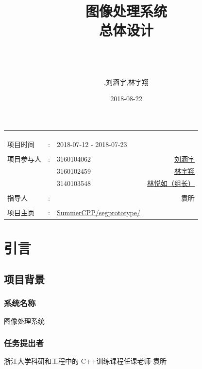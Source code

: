 \documentclass[14pt,a4paper]{article}
\title{ \Huge 图像处理系统 \\\LARGE 总体设计}
\author{\newline \\\\\\ \textsc{\Large林悦如,刘涵宇,林宇翔}  }
\date{\Large 2018-08-22}
\begin{document}
\newpage
\maketitle 

\begin{center}
\begin{tabular}{l r l r}
\\ \\ \\ \\ 
\large 项目时间&: & 2018-07-12 - 2018-07-23 & \\ \\  
\large 项目参与人&: & \large3160104062 & \large \href{mailto:544766109@qq.com}{刘涵宇}\\
\large & &\large 3160102459 & \large\href{mailto:2106706074@qq.com}{林宇翔} \\
\large & &\large3140103548 &\large\href{mailto:lo0g1t7031@gmail.com}{林悦如（组长）} \\ \\
\large 指导人&: &  & \large 袁昕 \\\\
\large 项目主页&: & \large \href{https://www.github.com/SummerCPP/segprototype/}{SummerCPP/segprototype/}
\end{tabular}
\end{center}


\newpage
\hypersetup{colorlinks=false}
\tableofcontents



\newpage
\section{引言}
\subsection{项目背景}
\subsubsection{系统名称}
图像处理系统
\subsubsection{任务提出者}
浙江大学科研和工程中的 C++训练课程任课老师-袁昕
\end{document}
